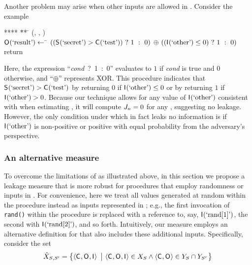 Another problem may arise when other inputs are allowed in \AIIFn{}.
Consider the example
\begin{tabbing}
  **** \= ** \= \kill
  \> \proc(\ACIFn{}, \AIIFn{}, \SecFn{}) \\
  \> \> $\mathsf{O}_{}(\textrm{`result'}) \gets$
     \= $((\mathsf{S}_{}(\textrm{`secret'})  > \mathsf{C}_{}(\textrm{`test'}))~?~1~:~0)$
   $\oplus~((\mathsf{I}_{}(\textrm{`other'}) \le 0)~?~1~:~0)$ \\
  \> \> return \AOOFn{}
\end{tabbing}
Here, the expression ``\textit{cond}~?~1~:~0'' evaluates to $1$ if
\textit{cond} is true and $0$ otherwise, and ``$\oplus$'' represents
XOR.  This procedure indicates that $\mathsf{S}_{}(\textrm{`secret'}) >
\mathsf{C}_{}(\textrm{`test'})$ by returning $0$ if
$\mathsf{I}_{}(\textrm{`other'}) \le 0$ or by returning $1$ if
$\mathsf{I}_{}(\textrm{`other'}) > 0$.  Because our technique allows for
any value of $\mathsf{I}_{}(\textrm{`other'})$ consistent with
\postcondition{\proc}{} when estimating
\setSize{\possibleDoubles{\secretsSet{}}}, it will compute
$J_{n} = 0$ for any \secretsSetSize, suggesting no
leakage.  However, the only condition under which \proc in fact leaks
no information is if $\mathsf{I}_{}(\textrm{`other'})$ is non-positive or
positive with equal probability from the adversary's perspective.

\subsubsection{An alternative measure}
\label{sscf:sec:measurement:random:measure}

To overcome the limitations of \Jaccard{\secretsSetSize} as
illustrated above, in this section we propose a leakage measure that
is more robust for procedures that employ randomness or inputs in
\AIIFn{}.  For convenience, here we treat all values generated at
random within the procedure instead as inputs represented in \AIIFn{};
e.g., the first invocation of \texttt{rand()} within the procedure is
replaced with a reference to, say, $\mathsf{I}_{}(\textrm{`rand[1]'})$, the
second with $\mathsf{I}_{}(\textrm{`rand[2]'})$, and so forth.
Intuitively, our measure employs an alternative definition for
\possibleDoubles{\secretsSet{}} that also includes these additional
inputs.  Specifically, consider the set \possibleTriplesIntersect{\secretsSet{}}{\secretsSetAlt{}}
\[
\hat{X}_{{S_{}},{S_{}'}}
= \left\{\langle\mathsf{C}_{}, \mathsf{O}_{}, \mathsf{I}_{}\rangle
~\left|~ \langle\mathsf{C}_{}, \mathsf{O}_{}, \mathsf{I}_{}\rangle \in X_{S_{}} \wedge \langle\mathsf{C}_{}, \mathsf{O}_{} \rangle \in Y_{S_{}} \cap Y_{S_{}'}\right.\right\}
\]
\fi

